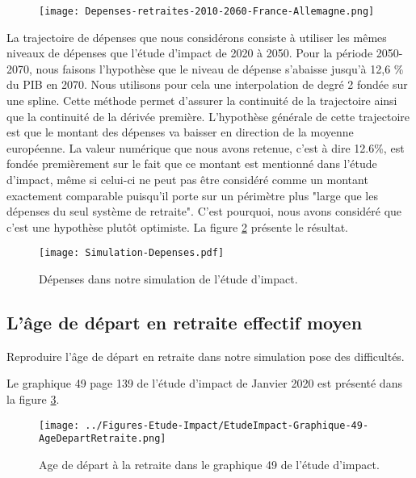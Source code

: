 \documentclass[10pt]{article}
\begin{document}
\begin{figure}
\begin{center}
\texttt{[image: Depenses-retraites-2010-2060-France-Allemagne.png]}
\end{center}
\caption{}
\label{fig-depenses-France-Allemagne}
\end{figure}

La trajectoire de dépenses que nous considérons consiste à utiliser les mêmes 
niveaux de dépenses que l'étude d'impact de 2020 à 2050. 
Pour la période 2050-2070, nous faisons l'hypothèse que le niveau 
de dépense s'abaisse jusqu'à 12,6 \% du PIB en 2070. 
Nous utilisons pour cela une interpolation de degré 2 fondée sur une spline. 
Cette méthode permet d'assurer la continuité de la trajectoire ainsi que la continuité 
de la dérivée première. 
L'hypothèse générale de cette trajectoire est que le montant des dépenses 
va baisser en direction de la moyenne européenne. 
La valeur numérique que nous avons retenue, c'est à dire 12.6\%, est fondée premièrement 
sur le fait que ce montant est mentionné dans l'étude d'impact, même si celui-ci ne peut pas 
être considéré comme un montant exactement comparable puisqu'il porte 
sur un périmètre plus "large que les dépenses du seul système de retraite". 
C'est pourquoi, nous avons considéré que c'est une hypothèse plutôt optimiste. 
La figure \ref{fig-dépenses-simulation} présente le résultat. 

\begin{figure}
\begin{center}
\texttt{[image: Simulation-Depenses.pdf]}
\end{center}
\caption{Dépenses dans notre simulation de l'étude d'impact.}
\label{fig-dépenses-simulation}
\end{figure}


\subsection{L'âge de départ en retraite effectif moyen}

Reproduire l'âge de départ en retraite dans notre simulation 
pose des difficultés. 

Le graphique 49 page 139 de l'étude d'impact de Janvier 2020 est présenté 
dans la figure \ref{fig-age-etude-impact}.

\begin{figure}
\begin{center}
\texttt{[image: ../Figures-Etude-Impact/EtudeImpact-Graphique-49-AgeDepartRetraite.png]}
\end{center}
\caption{Age de départ à la retraite dans le graphique 49 de l'étude d'impact.}
\label{fig-age-etude-impact}
\end{figure}
\end{document}
